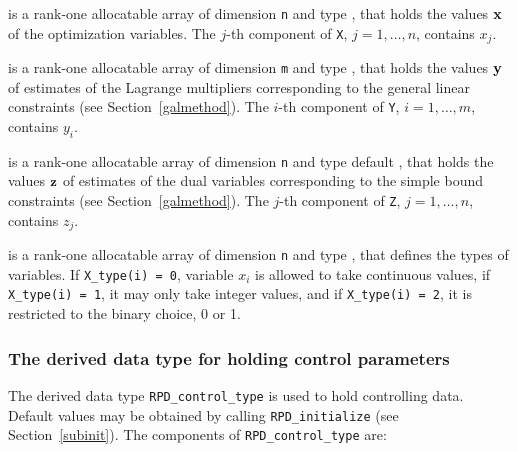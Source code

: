 \documentclass{galahad}
\newcommand{\packagename}{RPD}
\begin{document}
\begin{description}
 is a rank-one allocatable array of dimension {\tt n} and type
\realdp,
that holds the values ${\mathbf{x}}$ of the optimization variables.
The $j$-th component of {\tt X}, $j = 1,  \ldots , n$, contains $x_{j}$.

 is a rank-one allocatable array of dimension {\tt m} and type
\realdp, that holds
the values ${\mathbf{y}}$ of estimates  of the Lagrange multipliers
corresponding to the general linear constraints (see Section~\ref{galmethod}).
The $i$-th component of {\tt Y}, $i = 1,  \ldots ,  m$, contains $y_{i}$.

 is a rank-one allocatable array of dimension {\tt n} and type default
\realdp, that holds
the values ${\mathbf{z}}$ of estimates  of the dual variables
corresponding to the simple bound constraints (see Section~\ref{galmethod}).
The $j$-th component of {\tt Z}, $j = 1,  \ldots ,  n$, contains $z_{j}$.

 is a rank-one allocatable array of dimension {\tt n} and type
\integer, that defines the types of variables. If {\tt X\_type(i) = 0},
variable $x_i$ is allowed to take continuous values, if {\tt X\_type(i) = 1},
it may only take integer values, and if {\tt X\_type(i) = 2}, it is
restricted to the binary choice, 0 or 1.

\end{description}


\subsubsection{The derived data type for holding control
 parameters}\label{typecontrol}
The derived data type
{\tt \packagename\_control\_type}
is used to hold controlling data. Default values may be obtained by calling
{\tt \packagename\_initialize}
(see Section~\ref{subinit}). The components of
{\tt \packagename\_control\_type}
are:
\end{document}

